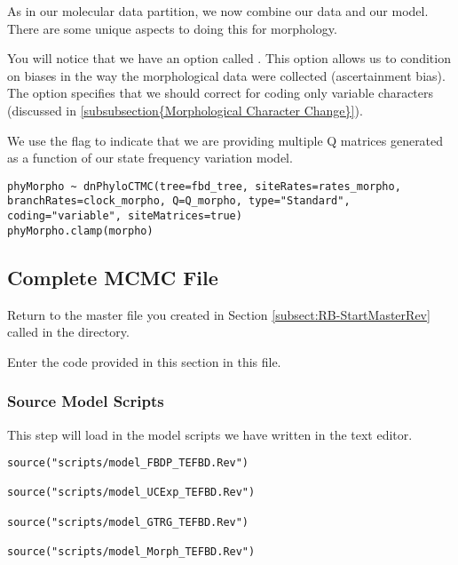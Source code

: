 As in our molecular data partition, we now combine our data and our model. There are some unique aspects to doing this for morphology. \par
You will notice that we have an option called . This option allows us to condition on biases in the way the morphological data were collected (ascertainment bias).
The option  specifies that we should correct for coding only variable characters (discussed in \ref{subsubsection{Morphological Character Change}}). \par

We use the flag  to indicate that we are providing multiple Q matrices generated as a function of our state frequency variation model. \par


{\tt \begin{snugshade*}
\begin{lstlisting}
phyMorpho ~ dnPhyloCTMC(tree=fbd_tree, siteRates=rates_morpho, branchRates=clock_morpho, Q=Q_morpho, type="Standard", coding="variable", siteMatrices=true)
phyMorpho.clamp(morpho)
\end{lstlisting}
\end{snugshade*}}


\bigskip

\subsection{Complete MCMC File}\label{subsect:RB-CompleteMCMC}

{\begin{framed}
Return to the master \Rev file you created in Section \ref{subsect:RB-StartMasterRev} called {\textcolor{red}{}} in the  directory.

Enter the \Rev code provided in this section in this file.
\end{framed}}

\medskip
\subsubsection{Source Model Scripts}\label{subsub:RB-SourceMods}

This step will load in the model scripts we have written in the text editor.

{\tt \begin{snugshade*}
\begin{lstlisting}
source("scripts/model_FBDP_TEFBD.Rev")

source("scripts/model_UCExp_TEFBD.Rev")

source("scripts/model_GTRG_TEFBD.Rev")

source("scripts/model_Morph_TEFBD.Rev")
\end{lstlisting}
\end{snugshade*}}



